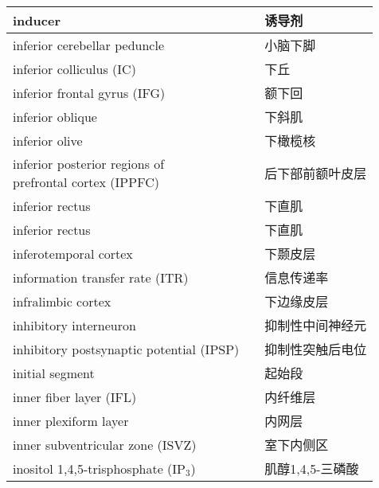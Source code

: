 \begin{longtable}{lll}
	\midrule
	inducer  && 诱导剂  \\
	
	\midrule \label{term:inferior_cerebellar_peduncel}
	inferior cerebellar peduncle   && 小脑下脚  \\
	
	\midrule
	inferior colliculus (IC)   && 下丘  \\
	
	\midrule
	inferior frontal gyrus (IFG)   && 额下回  \\
	
	\midrule
	inferior oblique   && 下斜肌  \\
	
	\midrule
	inferior olive   && 下橄榄核  \\
	
	\midrule
	\makecell[l]{inferior posterior regions of \\ prefrontal cortex (IPPFC)}  && 后下部前额叶皮层  \\
	
	\midrule
	inferior rectus   && 下直肌  \\
	
	\midrule
	inferior rectus   && 下直肌  \\
	
	\midrule
	inferotemporal cortex   && 下颞皮层  \\
	
	\midrule
	information transfer rate (ITR)   && 信息传递率  \\
	
	\midrule
	infralimbic cortex   && 下边缘皮层  \\
	
	\midrule
	inhibitory interneuron  && 抑制性中间神经元  \\
	
	\midrule
	inhibitory postsynaptic potential (IPSP)  && 抑制性突触后电位  \\
	
	\midrule
	initial segment && 起始段  \\
	
	\midrule
	inner fiber layer (IFL)   && 内纤维层  \\
	
	\midrule
	inner plexiform layer   && 内网层  \\
	
	\midrule
	inner subventricular zone (ISVZ)   && 室下内侧区  \\
	
	\midrule
	inositol 1,4,5-trisphosphate  (IP$_3$) && 肌醇1,4,5-三磷酸  \\
	

\end{longtable}
